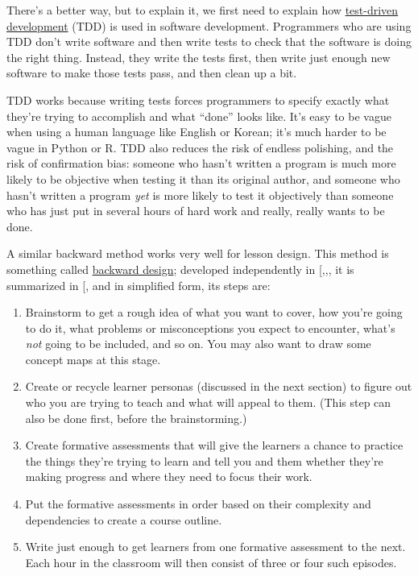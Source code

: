 There's a better way, but to explain it, we first need to explain how
\protect\hyperlink{g:test-driven-development}{test-driven development} (TDD)
is used in software development. Programmers who are using TDD don't
write software and then write tests to check that the software is
doing the right thing. Instead, they write the tests first, then write
just enough new software to make those tests pass, and then clean up a
bit.

TDD works because writing tests forces programmers to specify exactly
what they're trying to accomplish and what ``done'' looks like. It's
easy to be vague when using a human language like English or Korean;
it's much harder to be vague in Python or R. TDD also reduces the risk
of endless polishing, and the risk of confirmation bias: someone who
hasn't written a program is much more likely to be objective when
testing it than its original author, and someone who hasn't written a
program \emph{yet} is more likely to test it objectively than someone who
has just put in several hours of hard work and really, really wants to
be done.

A similar backward method works very well for lesson design. This
method is something called \protect\hyperlink{g:backward-design}{backward design};
developed independently in
{[},,\protect[\hyperlink{b:Fink2013}{Fink2013}]{]}, it is
summarized in {[}\protect[\hyperlink{b:McTi2013}{McTi2013}]{]}, and in simplified form, its steps
are:

\begin{enumerate}
\item
  Brainstorm to get a rough idea of what you want to cover, how
  you're going to do it, what problems or misconceptions you expect
  to encounter, what's \emph{not} going to be included, and so on. You may
  also want to draw some concept maps at this stage.
\item
  Create or recycle learner personas (discussed in the next section)
  to figure out who you are trying to teach and what will appeal to
  them. (This step can also be done first, before the brainstorming.)
\item
  Create formative assessments that will give the learners a chance
  to practice the things they're trying to learn and tell you and
  them whether they're making progress and where they need to focus
  their work.
\item
  Put the formative assessments in order based on their complexity
  and dependencies to create a course outline.
\item
  Write just enough to get learners from one formative assessment to
  the next. Each hour in the classroom will then consist of three or
  four such episodes.
\end{enumerate}

